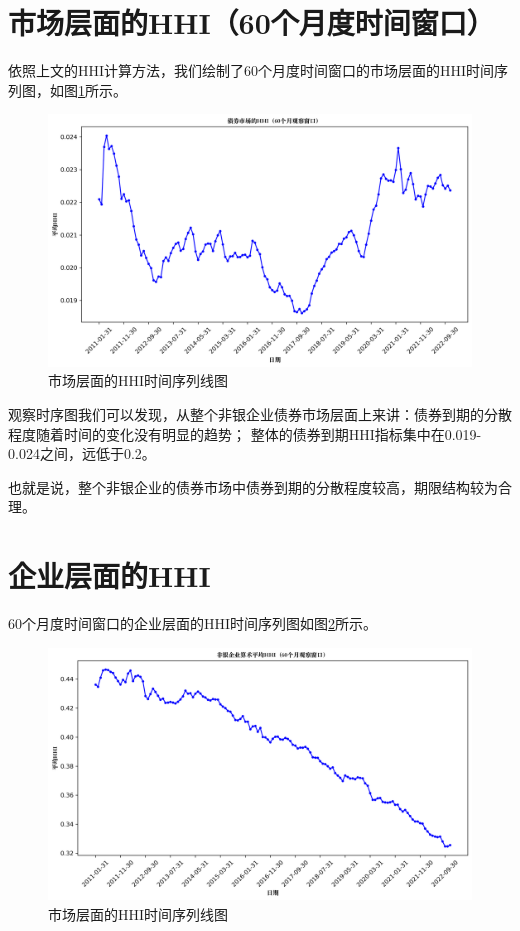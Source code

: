 \documentclass[a4paper,12pt]{report}
\begin{document}
    \section{市场层面的HHI（60个月度时间窗口）}
    依照上文的HHI计算方法，我们绘制了60个月度时间窗口的市场层面的HHI时间序列图，如图\ref{fig:output1}所示。

    \begin{figure}[htbp]
        \centering
        \includegraphics[scale=0.6]{figure/output1}
        \caption{市场层面的HHI时间序列线图}
        \label{fig:output1}
    \end{figure}
    观察时序图我们可以发现，从整个非银企业债券市场层面上来讲：债券到期的分散程度随着时间的变化没有明显的趋势；
    整体的债券到期HHI指标集中在0.019-0.024之间，远低于0.2。
    
    也就是说，整个非银企业的债券市场中债券到期的分散程度较高，期限结构较为合理。

    \section{企业层面的HHI}
    60个月度时间窗口的企业层面的HHI时间序列图如图\ref{fig:output2}所示。
    \begin{figure}[htbp]
        \centering
        \includegraphics[scale=0.6]{figure/output2}
        \caption{市场层面的HHI时间序列线图}
        \label{fig:output2}
    \end{figure}
    
\end{document}
